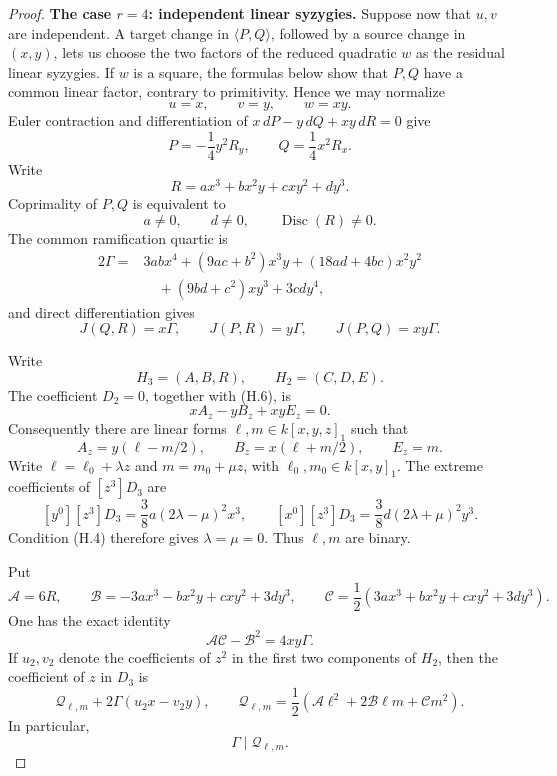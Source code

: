 \begin{proof}
\medskip
\noindent
\textbf{The case \(r=4\): independent linear syzygies.}
Suppose now that \(u,v\) are independent.  A target change in
\(\langle P,Q\rangle\), followed by a source change in \((x,y)\), lets
us choose the two factors of the reduced quadratic \(w\) as the residual
linear syzygies.  If \(w\) is a square, the formulas below show that
\(P,Q\) have a common linear factor, contrary to primitivity.  Hence we
may normalize
\[
 u=x,
 \qquad
 v=y,
 \qquad
 w=xy.
\]
Euler contraction and differentiation of
\(x\,dP-y\,dQ+xy\,dR=0\) give
\begin{equation}
 P=-\frac14y^2R_y,
 \qquad
 Q=\frac14x^2R_x.                       \tag{H.3}
\end{equation}
Write
\[
 R=ax^3+bx^2y+cxy^2+dy^3.
\]
Coprimality of \(P,Q\) is equivalent to
\[
 a\ne0,
 \qquad
 d\ne0,
 \qquad
 \operatorname{Disc}(R)\ne0.           \tag{H.4}
\]
The common ramification quartic is
\begin{equation}
\begin{aligned}
2\Gamma={}&3abx^4+(9ac+b^2)x^3y+(18ad+4bc)x^2y^2\\
&\quad +(9bd+c^2)xy^3+3cdy^4,
\end{aligned}
\tag{H.5}
\end{equation}
and direct differentiation gives
\[
 J(Q,R)=x\Gamma,
 \qquad
 J(P,R)=y\Gamma,
 \qquad
 J(P,Q)=xy\Gamma.                       \tag{H.6}
\]

Write
\[
 H_3=(A,B,R),
 \qquad
 H_2=(C,D,E).
\]
The coefficient \(D_2=0\), together with (H.6), is
\[
 xA_z-yB_z+xyE_z=0.
\]
Consequently there are linear forms \(\ell,m\in k[x,y,z]_1\) such that
\[
 A_z=y(\ell-m/2),
 \qquad
 B_z=x(\ell+m/2),
 \qquad
 E_z=m.                                 \tag{H.7}
\]
Write \(\ell=\ell_0+\lambda z\) and \(m=m_0+\mu z\), with
\(\ell_0,m_0\in k[x,y]_1\).  The extreme coefficients of
\([z^3]D_3\) are
\[
 [y^0][z^3]D_3=\frac38a(2\lambda-\mu)^2x^3,
 \qquad
 [x^0][z^3]D_3=\frac38d(2\lambda+\mu)^2y^3.
\]
Condition (H.4) therefore gives \(\lambda=\mu=0\).  Thus
\(\ell,m\) are binary.

Put
\[
 \mathcal A=6R,
 \qquad
 \mathcal B=-3ax^3-bx^2y+cxy^2+3dy^3,
 \qquad
 \mathcal C=\frac12(3ax^3+bx^2y+cxy^2+3dy^3).
\]
One has the exact identity
\begin{equation}
 \mathcal A\mathcal C-\mathcal B^2=4xy\Gamma.       \tag{H.8}
\end{equation}
If \(u_2,v_2\) denote the coefficients of \(z^2\) in the first two
components of \(H_2\), then the coefficient of \(z\) in \(D_3\) is
\begin{equation}
 \mathcal Q_{\ell,m}+2\Gamma(u_2x-v_2y),
 \qquad
 \mathcal Q_{\ell,m}
 =\frac12(\mathcal A\ell^2+2\mathcal B\ell m+\mathcal C m^2).
 \tag{H.9}
\end{equation}
In particular,
\begin{equation}
 \Gamma\mid\mathcal Q_{\ell,m}.         \tag{H.10}
\end{equation}


\end{proof}
